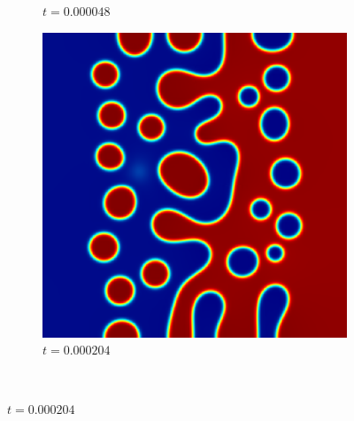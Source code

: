 \begin{figure}[ht]
\begin{subfigure}[t]{.3\linewidth}
		\vspace{-.4\baselineskip}
		\caption{{$t=0.000048$}}
	\end{subfigure}
	\begin{subfigure}[t]{.3\linewidth}
		\center
		\includegraphics[scale=.25]{linear_ch_5_204}
		\vspace{-.4\baselineskip}
		\caption{{$t=0.000204$}}
	\end{subfigure}\\
	\vspace{.2\baselineskip}


\end{figure}

